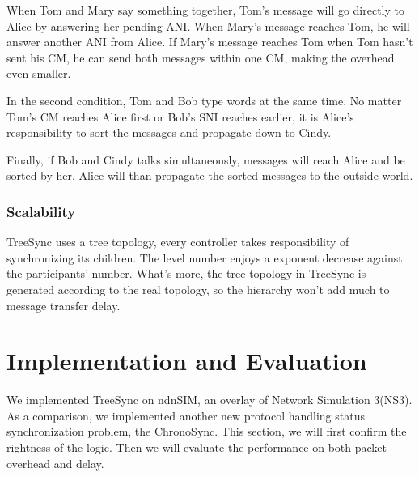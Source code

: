 \documentclass[conference]{IEEEtran}
\begin{document}
When Tom and Mary say something together,
Tom's message will go directly to Alice by answering her pending ANI.
When Mary's message reaches Tom, he will answer another ANI from Alice.
If Mary's message reaches Tom when Tom hasn't sent his CM,
he can send both messages within one CM, making the overhead even smaller.

In the second condition, Tom and Bob type words at the same time.
No matter Tom's CM reaches Alice first or Bob's SNI reaches earlier,
it is Alice's responsibility to sort the messages and propagate down to Cindy.

Finally, if Bob and Cindy talks simultaneously,
messages will reach Alice and be sorted by her.
Alice will than propagate the sorted messages to the outside world.

\subsubsection{Scalability}
TreeSync uses a tree topology, every controller takes responsibility of synchronizing its children.
The level number enjoys a exponent decrease against the participants' number.
What's more, the tree topology in TreeSync is generated according to the real topology,
so the hierarchy won't add much to message transfer delay.

\section{Implementation and Evaluation}
\label{implementation}
We implemented TreeSync on ndnSIM,
an overlay of Network Simulation 3(NS3)\cite{ns3}.
As a comparison, we implemented another new protocol handling status synchronization problem,
the ChronoSync. This section, we will first confirm the rightness of the logic.
Then we will evaluate the performance on both packet overhead and delay.
\end{document}
